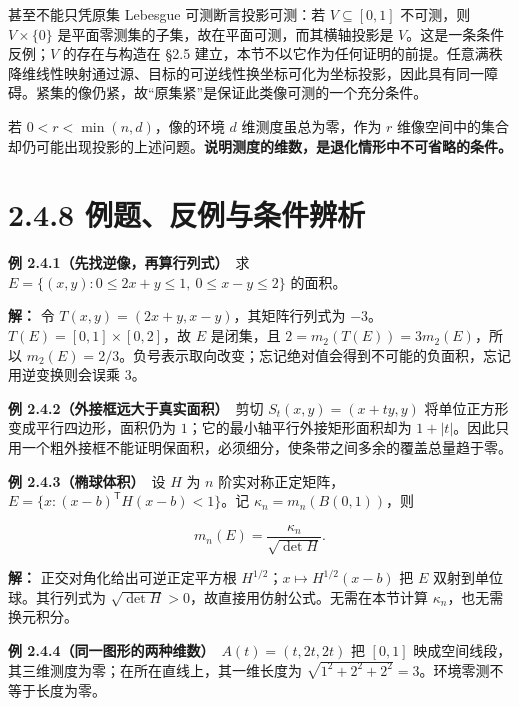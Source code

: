 \documentclass[11pt,a4paper]{article}
\begin{document}
甚至不能只凭原集 Lebesgue 可测断言投影可测：若 \(V\subseteq[0,1]\)
不可测，则 \(V\times\{0\}\)
是平面零测集的子集，故在平面可测，而其横轴投影是
\(V\)。这是一条条件反例；\(V\) 的存在与构造在 §2.5
建立，本节不以它作为任何证明的前提。任意满秩降维线性映射通过源、目标的可逆线性换坐标可化为坐标投影，因此具有同一障碍。紧集的像仍紧，故``原集紧''是保证此类像可测的一个充分条件。

若 \(0<r<\min(n,d)\)，像的环境 \(d\) 维测度虽总为零，作为 \(r\)
维像空间中的集合却仍可能出现投影的上述问题。\textbf{说明测度的维数，是退化情形中不可省略的条件。}

\section[\S{}2.4.8
例题、反例与条件辨析]{2.4.8
例题、反例与条件辨析}\label{ux4f8bux9898ux53cdux4f8bux4e0eux6761ux4ef6ux8fa8ux6790}

\textbf{例 2.4.1（先找逆像，再算行列式）}　求
\(E=\{(x,y):0\le2x+y\le1,\ 0\le x-y\le2\}\) 的面积。

\textbf{解：} 令 \(T(x,y)=(2x+y,x-y)\)，其矩阵行列式为
\(-3\)。\(T(E)=[0,1]\times[0,2]\)，故 \(E\) 是闭集，且
\(2=m_2(T(E))=3m_2(E)\)，所以
\(m_2(E)=2/3\)。负号表示取向改变；忘记绝对值会得到不可能的负面积，忘记用逆变换则会误乘
\(3\)。

\textbf{例 2.4.2（外接框远大于真实面积）}　剪切 \(S_t(x,y)=(x+ty,y)\)
将单位正方形变成平行四边形，面积仍为
\(1\)；它的最小轴平行外接矩形面积却为
\(1+|t|\)。因此只用一个粗外接框不能证明保面积，必须细分，使条带之间多余的覆盖总量趋于零。

\textbf{例 2.4.3（椭球体积）}　设 \(H\) 为 \(n\)
阶实对称正定矩阵，\(E=\{x:(x-b)^{\mathsf T}H(x-b)<1\}\)。记
\(\kappa_n=m_n(B(0,1))\)，则

\begin{equation*}
m_n(E)=\frac{\kappa_n}{\sqrt{\det H}}.
\tag{2.4.17}
\end{equation*}

\textbf{解：} 正交对角化给出可逆正定平方根
\(H^{1/2}\)；\(x\mapsto H^{1/2}(x-b)\) 把 \(E\) 双射到单位球。其行列式为
\(\sqrt{\det H}>0\)，故直接用仿射公式。无需在本节计算
\(\kappa_n\)，也无需换元积分。

\textbf{例 2.4.4（同一图形的两种维数）}　\(A(t)=(t,2t,2t)\) 把 \([0,1]\)
映成空间线段，其三维测度为零；在所在直线上，其一维长度为
\(\sqrt{1^2+2^2+2^2}=3\)。环境零测不等于长度为零。
\end{document}
